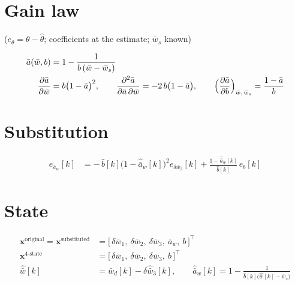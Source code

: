 \documentclass[11pt,a4paper,fontset=none]{ctexart}
\newcommand{\ba}{\bar{a}}
\newcommand{\bw}{\bar{w}}
\newcommand{\ah}{\hat{\ba}_w}
\newcommand{\bh}{\hat{b}}
\newcommand{\wh}{\hat{\bw}}
\begin{document}
\section{Gain law}

($e_\theta = \theta - \hat\theta$; coefficients at the estimate; $\bw_s$ known)

\begin{align*}
\ba(\bw, b) &= 1 - \frac{1}{b\,(\bw - \bw_s)} \\
\frac{\partial\ba}{\partial\bw} &= b\bigl(1-\ba\bigr)^{2}, \qquad
\frac{\partial^{2}\ba}{\partial\ba\,\partial\bw} = -2\,b\bigl(1-\ba\bigr), \qquad
\Bigl(\frac{\partial\ba}{\partial b}\Bigr)_{\bw,\,\bw_s} = \frac{1-\ba}{b}
\end{align*}

\section{Substitution}

\begin{align*}
e_{\ba_w}[k] &= -\,\bh[k]\bigl(1-\ah[k]\bigr)^{2}e_{\delta\bw_3}[k] + \frac{1-\ah[k]}{\bh[k]}\,e_b[k]
\end{align*}

\section{State}

\begin{align*}
\mathbf{x}^{\text{original}} = \mathbf{x}^{\text{substituted}}
  &= \bigl[\,\delta\bw_1,\ \delta\bw_2,\ \delta\bw_3,\ \ba_w,\ b\,\bigr]^{\top} \\
\mathbf{x}^{\text{4-state}} &= \bigl[\,\delta\bw_1,\ \delta\bw_2,\ \delta\bw_3,\ b\,\bigr]^{\top} \\
\wh[k] &= \bw_d[k] - \delta\hat{\bw}_3[k], \qquad
\ah[k] = 1 - \frac{1}{\bh[k]\bigl(\wh[k] - \bw_s\bigr)}
\end{align*}
\end{document}
